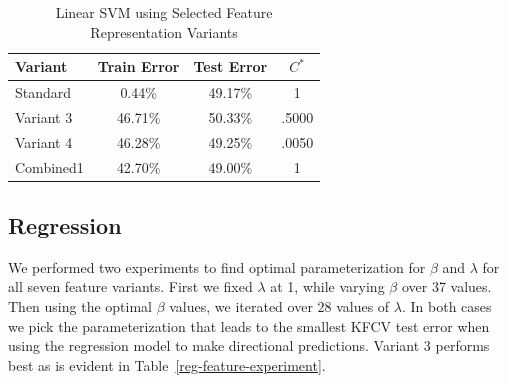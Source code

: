 \documentclass{article}
\begin{document}
\begin{table}
\caption{Linear SVM using Selected Feature Representation Variants}
\label{linear-svm}
\vskip 0.15in
\begin{center}
\begin{small}
\begin{sc}
\begin{tabular}{lccc}
\hline
\abovespace\belowspace
Variant & Train Error & Test Error & $C^*$ \\
\hline
\abovespace
Standard     & 0.44\% & 49.17\% & 1\\
Variant 3    & 46.71\% & 50.33\% & .5000\\
Variant 4    & 46.28\% & 49.25\% & .0050\\
Combined1    & 42.70\% & 49.00\% & 1\\
\hline
\end{tabular}
\end{sc}
\end{small}
\end{center}
\vskip -0.1in
\end{table}







\subsection{Regression}

We performed two experiments to find optimal parameterization for $\beta$ and $\lambda$ for all seven feature variants. First we fixed $\lambda$ at 1, while varying $\beta$ over 37 values. Then using the optimal  $\beta$ values, we iterated over $28$ values of $\lambda$. In both cases we pick the parameterization that leads to the smallest KFCV test error when using the regression model to make directional predictions. Variant 3 performs best as is evident
in Table~\ref{reg-feature-experiment}.
\end{document}
